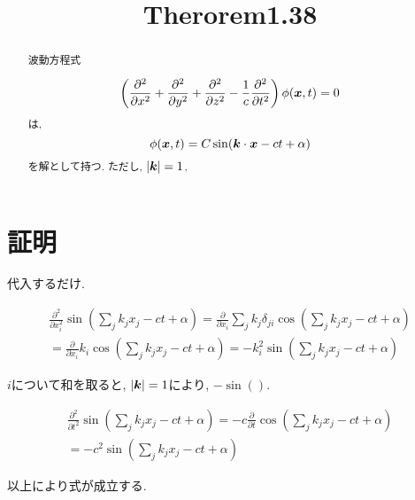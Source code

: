 \documentclass{jsarticle} \usepackage[dvipdfmx]{graphicx} \usepackage[dvipdfmx]{hyperref}
\title{Therorem1.38}
\newcommand*{\mbold}[1]{\mbox{\boldmath $#1$}}
\begin{document}
\maketitle

\begin{abstract}
  波動方程式
  
  \begin{equation}
    \left( \frac{\partial^2}{\partial x^2} + \frac{\partial^2}{\partial y^2} + \frac{\partial^2}{\partial z^2}- \frac{1}{c}\frac{\partial^2}{\partial t^2} \right) \phi(\mbold{x}, t) = 0
  \end{equation}
  は,  
  \begin{equation}
    \phi(\mbold{x}, t) = C\sin(\mbold{k}\cdot \mbold{x} - ct + \alpha)
  \end{equation}
  を解として持つ. ただし, $|\mbold{k}| = 1$, 
\end{abstract}

\section{証明}
代入するだけ. 

\begin{eqnarray}
  \frac{\partial^2}{\partial x_i^2} \sin(\sum_j k_j x_j - ct + \alpha)
  =
  \frac{\partial}{\partial x_i} \sum_j k_j \delta_{ji} \cos(\sum_j k_j x_j - ct + \alpha)
  \nonumber \\
  =
  \frac{\partial}{\partial x_i} k_i \cos(\sum_j k_j x_j - ct +\alpha)
  =
  -k_i^2 \sin(\sum_j k_j x_j - ct +\alpha)
\end{eqnarray}

$i$について和を取ると, $|\mbold{k}| = 1$により, $-\sin()$. 

\begin{eqnarray}
  \frac{\partial^2}{\partial t^2} \sin(\sum_j k_j x_j - ct + \alpha)
  =
  -c \frac{\partial}{\partial t} \cos(\sum_j k_j x_j - ct + \alpha)
  \nonumber \\
  =
  -c^2 \sin(\sum_j k_j x_j - ct + \alpha)
\end{eqnarray}

以上により式が成立する. 
\end{document}
